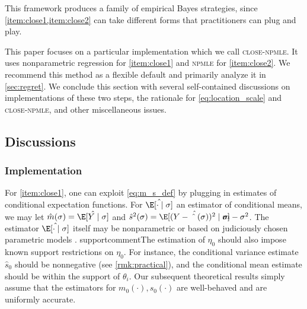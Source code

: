 \documentclass[12pt, reqno]{amsart}
\newcommand{\hatm}{\hat m}
\newcommand{\hats}{\hat s}
\newcommand{\close}{\textsc{close}}
\newcommand{\npmle}{\textsc{npmle}}
\newcommand{\closenpmle}{\close-\npmle}
\numberwithin{equation}{section}
\begin{document}
This framework produces a family of empirical Bayes strategies,  since
\cref{item:close1,item:close2} can take different forms that practitioners can plug and
 play. 

This paper focuses on a particular implementation which we call \closenpmle. It uses
nonparametric regression for \cref{item:close1} and \npmle{} for 
\cref{item:close2}. We recommend this method as a flexible default and primarily analyze
it in \cref{sec:regret}. We conclude this section with several
self-contained discussions on implementations of
these two steps, the rationale for \eqref{eq:location_scale} and
\closenpmle, and other miscellaneous issues.

\subsection{Discussions}
\label{sub:model_discussions}

\subsubsection{Implementation}
\label{sub:implementation}

For \cref{item:close1}, one can exploit \eqref{eq:m_s_def} by plugging in estimates of
conditional expectation functions. For $\hat \E[\cdot
\mid \sigma]$ an estimator of conditional means, we may let $\hatm (\sigma) = \hat\E [Y
\mid
\sigma]$ and $\hats^2(\sigma) = \hat\E[(Y - \hatm(\sigma))^2 \mid \sigma] - \sigma^2$. The
 estimator $\hat\E[\cdot \mid \sigma]$ itself may be nonparametric or based on
 judiciously chosen parametric models \citep[see][ for suggestions of the latter]
 {eb_hole}. \Copy
 {supportcomment}{The estimation of $\eta_0$ should also impose known support
 restrictions on $\eta_0$. For instance, the conditional variance estimate $\hat s_0$
 should be nonnegative (see \cref{rmk:practical}), and the conditional mean estimate
 should be within the support of $\theta_i$.} Our subsequent theoretical results simply
 assume that the estimators for $m_0(\cdot), s_0(\cdot)$ are well-behaved and are
 uniformly accurate. 
\end{document}
